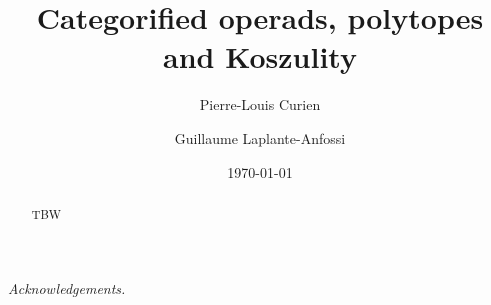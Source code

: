 \documentclass[10pt]{amsart}
\title{Categorified operads, polytopes and Koszulity}
\author{Pierre-Louis Curien}
\author{Guillaume Laplante-Anfossi}
\date{\today}
\begin{document}
\begin{abstract}
TBW
\end{abstract}

\maketitle









\emph{Acknowledgements.}    




\end{document}
